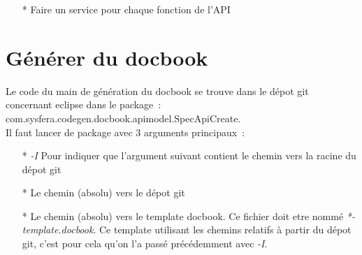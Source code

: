 \documentclass{article}
\begin{document}
\begin{itemize}
\begin{itemize}
\begin{itemize}
\begin{itemize}
      \item[\$] Direction~: Si le port est en entr\'ee, en sortie, ou les deux
      \item[\$] Name~: Le nom du port
      \item[\$] Optionnal~: Si le param\`etre est optionnel (il a une valeur par d\'efaut qui lui est attribu\'e)
      \item[\$] Short Option Letter~: Si ce port est une option pour la ligne de commande est qu'il est de type simple, alors on sp\'ecifie ici la lettre \`a utiliser pour l'option de ce param\`etre
      \end{itemize}
    \end{itemize}
  \end{itemize}
\item[*] Faire un service pour chaque fonction de l'API
\end{itemize}

\section*{G\'en\'erer du docbook}
Le code du main de g\'en\'eration du docbook se trouve dans le d\'epot git concernant eclipse dans le package~:\\
com.sysfera.codegen.docbook.apimodel.SpecApiCreate. \\
Il faut lancer de package avec 3 arguments principaux~:
\begin{itemize}
\item[*] \textit{-I} Pour indiquer que l'argument suivant contient le chemin vers la racine du d\'epot git
\item[*] Le chemin (absolu) vers le d\'epot git
\item[*] Le chemin (absolu) vers le template docbook. Ce fichier doit etre nomm\'e \textit{*-template.docbook}. Ce template utilisant les chemins relatifs \`a partir du d\'epot git, c'est pour cela qu'on l'a pass\'e pr\'ec\'edemment avec \textit{-I}.
\end{itemize}
\end{document}
